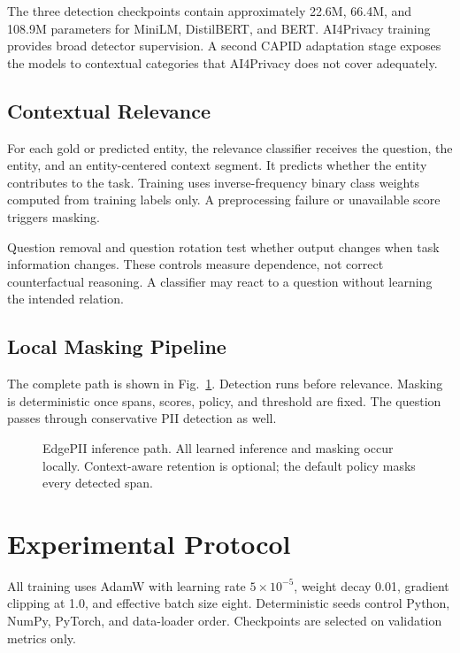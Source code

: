 \documentclass[conference]{IEEEtran}
\begin{document}
The three detection checkpoints contain approximately 22.6M, 66.4M, and 108.9M parameters for MiniLM, DistilBERT, and BERT. AI4Privacy training provides broad detector supervision. A second CAPID adaptation stage exposes the models to contextual categories that AI4Privacy does not cover adequately.

\subsection{Contextual Relevance}
For each gold or predicted entity, the relevance classifier receives the question, the entity, and an entity-centered context segment. It predicts whether the entity contributes to the task. Training uses inverse-frequency binary class weights computed from training labels only. A preprocessing failure or unavailable score triggers masking.

Question removal and question rotation test whether output changes when task information changes. These controls measure dependence, not correct counterfactual reasoning. A classifier may react to a question without learning the intended relation.

\subsection{Local Masking Pipeline}
The complete path is shown in Fig.~\ref{fig:system}. Detection runs before relevance. Masking is deterministic once spans, scores, policy, and threshold are fixed. The question passes through conservative PII detection as well.

\begin{figure}[t]
\centering
{}
\caption{EdgePII inference path. All learned inference and masking occur locally. Context-aware retention is optional; the default policy masks every detected span.}
\label{fig:system}
\end{figure}

\section{Experimental Protocol}
All training uses AdamW with learning rate $5\times10^{-5}$, weight decay 0.01, gradient clipping at 1.0, and effective batch size eight. Deterministic seeds control Python, NumPy, PyTorch, and data-loader order. Checkpoints are selected on validation metrics only.
\end{document}
